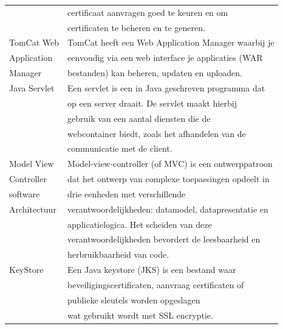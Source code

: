 \documentclass[]{article}
\begin{document}
\begin{tabular}{|| l | l ||}
                     & certificaat aanvragen goed te keuren en om           \\
                     & certificaten te beheren en te generen.               \\\hline
    TomCat Web       & TomCat heeft een Web Application Manager waarbij je  \\
    Application      & eenvoudig via een web interface je applicaties (WAR  \\
    Manager          & bestanden) kan beheren, updaten en uploaden.         \\\hline
    Java Servlet     & Een servlet is een in Java geschreven programma dat  \\
                     & op een server draait. De servlet maakt hierbij       \\
                     & gebruik van een aantal diensten die de               \\
                     & webcontainer biedt, zoals het afhandelen van de      \\
                     & communicatie met de client.                          \\\hline
    Model View       & Model-view-controller (of MVC) is een ontwerppatroon \\
    Controller       & dat het ontwerp van complexe toepassingen opdeelt in \\
    software         & drie eenheden met verschillende                      \\
    Architectuur     & verantwoordelijkheden: datamodel, datapresentatie en \\
                     & applicatielogica. Het scheiden van deze              \\
                     & verantwoordelijkheden bevordert de leesbaarheid en   \\
                     & herbruikbaarheid van code.                           \\\hline
    KeyStore         & Een Java keystore (JKS) is een bestand waar          \\
                     & beveiligingscertificaten, aanvraag certificaten of   \\
                     & publieke sleutels worden opgeslagen                  \\
                     & wat gebruikt wordt met SSL encryptie.                \\\hline
\end{tabular}
\newpage
\end{document}
